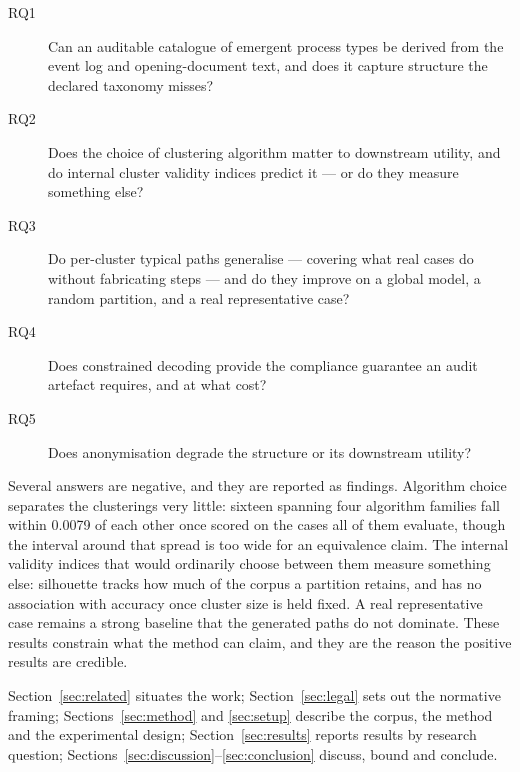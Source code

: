 \begin{description}
  \item[RQ1] Can an auditable catalogue of emergent process types be derived from the event log
    and opening-document text, and does it capture structure the declared taxonomy misses?
  \item[RQ2] Does the choice of clustering algorithm matter to downstream utility, and do
    internal cluster validity indices predict it --- or do they measure something else?
  \item[RQ3] Do per-cluster typical paths generalise --- covering what real cases do without
    fabricating steps --- and do they improve on a global model, a random partition, and a real
    representative case?
  \item[RQ4] Does constrained decoding provide the compliance guarantee an audit artefact
    requires, and at what cost?
  \item[RQ5] Does anonymisation degrade the structure or its downstream utility?
\end{description}

Several answers are negative, and they are reported as findings. Algorithm choice separates the
clusterings very little: sixteen spanning four algorithm families fall within 0.0079 of each
other once scored on the cases all of them evaluate, though the interval around that spread is
too wide for an equivalence claim. The internal validity indices that would ordinarily choose
between them measure something else: silhouette tracks how much of the corpus a partition
retains, and has no association with accuracy once cluster size is held fixed. A real
representative case remains a strong baseline that the generated paths do not dominate. These results constrain what the method can claim, and they
are the reason the positive results are credible.

Section~\ref{sec:related} situates the work; Section~\ref{sec:legal} sets out the normative
framing; Sections~\ref{sec:method} and \ref{sec:setup} describe the corpus, the method and the
experimental design; Section~\ref{sec:results} reports results by research question;
Sections~\ref{sec:discussion}--\ref{sec:conclusion} discuss, bound and conclude.
